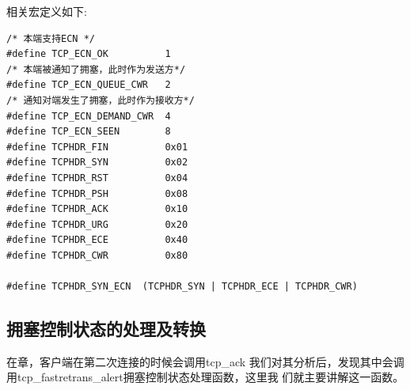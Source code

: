             相关宏定义如下:
\begin{verbatim}
/* 本端支持ECN */  
#define TCP_ECN_OK          1
/* 本端被通知了拥塞，此时作为发送方*/
#define TCP_ECN_QUEUE_CWR   2
/* 通知对端发生了拥塞，此时作为接收方*/
#define TCP_ECN_DEMAND_CWR  4
#define TCP_ECN_SEEN        8
#define TCPHDR_FIN          0x01
#define TCPHDR_SYN          0x02
#define TCPHDR_RST          0x04
#define TCPHDR_PSH          0x08
#define TCPHDR_ACK          0x10
#define TCPHDR_URG          0x20
#define TCPHDR_ECE          0x40
#define TCPHDR_CWR          0x80

#define TCPHDR_SYN_ECN  (TCPHDR_SYN | TCPHDR_ECE | TCPHDR_CWR)
\end{verbatim}

    \subsection{拥塞控制状态的处理及转换}
        在\label{ClientReceiveSYN+ACK:tcp_ack}章，客户端在第二次连接的时候会调用tcp\_ack
        我们对其分析后，发现其中会调用tcp\_fastretrans\_alert拥塞控制状态处理函数，这里我
        们就主要讲解这一函数。
